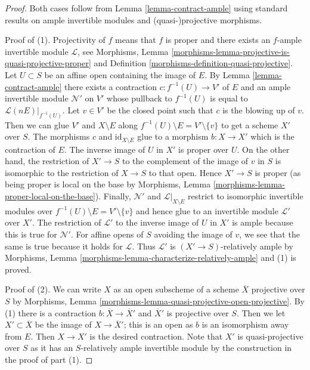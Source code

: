 \documentclass{stacks-project}
\theoremstyle{plain}
\theoremstyle{definition}
\theoremstyle{remark}
\numberwithin{equation}{subsection}
\begin{document}
\begin{proof}
Both cases follow from Lemma \ref{lemma-contract-ample}
using standard results on ample invertible modules and
(quasi-)projective morphisms.

\medskip\noindent
Proof of (1). Projectivity of $f$ means that $f$ is proper and there exists
an $f$-ample invertible module $\mathcal{L}$, see
Morphisms, Lemma \ref{morphisms-lemma-projective-is-quasi-projective-proper}
and Definition \ref{morphisms-definition-quasi-projective}.
Let $U \subset S$ be an affine open containing the image of $E$.
By Lemma \ref{lemma-contract-ample} there exists a contraction
$c : f^{-1}(U) \to V'$ of $E$ and an ample invertible module
$\mathcal{N}'$ on $V'$ whose pullback to $f^{-1}(U)$ is equal to
$\mathcal{L}(nE)|_{f^{-1}(U)}$. Let $v \in V'$ be the closed point
such that $c$ is the blowing up of $v$.
Then we can glue $V'$ and $X \setminus E$ along
$f^{-1}(U) \setminus E = V' \setminus \{v\}$
to get a scheme $X'$ over $S$. The morphisms $c$ and
$\text{id}_{X \setminus E}$ glue to a morphism $b : X \to X'$
which is the contraction of $E$. The inverse image of $U$ in $X'$
is proper over $U$. On the other hand, the restriction of $X' \to S$
to the complement of the image of $v$ in $S$ is isomorphic to the
restriction of $X \to S$ to that open. Hence $X' \to S$ is proper
(as being proper is local on the base by
Morphisms, Lemma \ref{morphisms-lemma-proper-local-on-the-base}).
Finally, $\mathcal{N}'$ and $\mathcal{L}|_{X \setminus E}$ restrict to
isomorphic invertible modules over $f^{-1}(U) \setminus E = V' \setminus \{v\}$
and hence glue to an invertible module $\mathcal{L}'$ over $X'$.
The restriction of $\mathcal{L}'$ to the inverse image of $U$
in $X'$ is ample because this is true for $\mathcal{N}'$.
For affine opens of $S$ avoiding the image of $v$, we see that
the same is true because it holds for $\mathcal{L}$.
Thus $\mathcal{L}'$ is $(X' \to S)$-relatively ample by
Morphisms, Lemma \ref{morphisms-lemma-characterize-relatively-ample}
and (1) is proved.

\medskip\noindent
Proof of (2). We can write $X$ as an open subscheme of a scheme
$\overline{X}$ projective over $S$ by Morphisms, Lemma
\ref{morphisms-lemma-quasi-projective-open-projective}.
By (1) there is a contraction $b : \overline{X} \to \overline{X}'$
and $\overline{X}'$ is projective over $S$. Then we let
$X' \subset \overline{X}$ be the image of $X \to \overline{X}'$;
this is an open as $b$ is an isomorphism away from $E$.
Then $X \to X'$ is the desired contraction. Note that
$X'$ is quasi-projective over $S$ as it has an
$S$-relatively ample invertible module
by the construction in the proof of part (1).
\end{proof}
\end{document}
